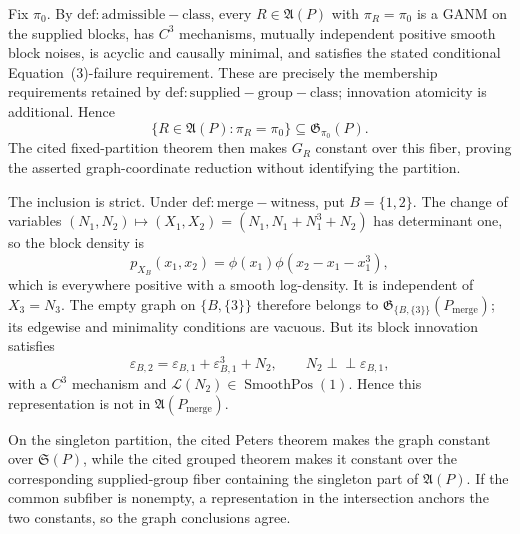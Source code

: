 Fix \(\pi_0\).  By \(\mathrm{def:admissible-class}\), every \(R\in\mathfrak A(P)\) with \(\pi_R=\pi_0\) is a GANM on the supplied blocks, has \(C^3\) mechanisms, mutually independent positive smooth block noises, is acyclic and causally minimal, and satisfies the stated conditional Equation~(3)-failure requirement.  These are precisely the membership requirements retained by \(\mathrm{def:supplied-group-class}\); innovation atomicity is additional.  Hence
\[
 \{R\in\mathfrak A(P):\pi_R=\pi_0\}\subseteq\mathfrak G_{\pi_0}(P).
\]
The cited fixed-partition theorem then makes \(G_R\) constant over this fiber, proving the asserted graph-coordinate reduction without identifying the partition.

The inclusion is strict.  Under \(\mathrm{def:merge-witness}\), put \(B=\{1,2\}\).  The change of variables \((N_1,N_2)\mapsto(X_1,X_2)=(N_1,N_1+N_1^3+N_2)\) has determinant one, so the block density is
\[
 p_{X_B}(x_1,x_2)=\phi(x_1)\phi(x_2-x_1-x_1^3),
\]
which is everywhere positive with a smooth log-density.  It is independent of \(X_3=N_3\).  The empty graph on \(\{B,\{3\}\}\) therefore belongs to \(\mathfrak G_{\{B,\{3\}\}}(P_{\mathrm{merge}})\); its edgewise and minimality conditions are vacuous.  But its block innovation satisfies
\[
 \varepsilon_{B,2}=\varepsilon_{B,1}+\varepsilon_{B,1}^3+N_2,
 \qquad N_2\perp\!\!\!\perp\varepsilon_{B,1},
\]
with a \(C^3\) mechanism and \(\mathcal L(N_2)\in\operatorname{SmoothPos}(1)\).  Hence this representation is not in \(\mathfrak A(P_{\mathrm{merge}})\).

On the singleton partition, the cited Peters theorem makes the graph constant over \(\mathfrak S(P)\), while the cited grouped theorem makes it constant over the corresponding supplied-group fiber containing the singleton part of \(\mathfrak A(P)\).  If the common subfiber is nonempty, a representation in the intersection anchors the two constants, so the graph conclusions agree.

